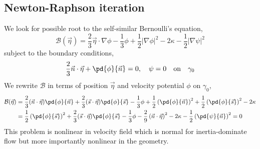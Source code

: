 \documentclass{jfm}
\begin{document}
\subsection{Newton-Raphson iteration}
We look for possible root to the self-similar Bernoulli's equation,
\begin{equation}
\mathcal{B}(\vec{\eta})=\frac{2}{3}\vec{\eta}\cdot \nabla \phi  -\frac{1}{3}\phi
+\frac{1}{2}|\nabla \phi|^2-2\kappa-\frac{1}{2}|\nabla \psi|^2
\end{equation}
subject to the boundary conditions,
\begin{equation}
\frac{2}{3}\vec{n}\cdot \vec{\eta}+\pd{\phi}{\vec{n}}=0,\quad
\psi =0 \quad\textrm{on}\quad\gamma_0
\end{equation}
We rewrite $\mathcal{B}$ in terms of position $\vec{\eta}$ and velocity potential $\phi$ on $\gamma_0$,
\begin{align}
\nonumber \mathcal{B}(\vec{\eta})&=\frac{2}{3}(\vec{n}\cdot\vec{\eta}) \pd{\phi}{\vec{n}}+
\frac{2}{3}(\vec{s}\cdot\vec{\eta}) \pd{\phi}{\vec{s}}
  -\frac{1}{3}\phi+\frac{1}{2}\left( \pd{\phi}{\vec{n}}\right)^2
  +\frac{1}{2}\left( \pd{\phi}{\vec{s}}\right)^2-2\kappa\\
  &=\frac{1}{2}\left( \pd{\phi}{\vec{s}}\right)^2+
  \frac{2}{3}(\vec{s}\cdot\vec{\eta}) \pd{\phi}{\vec{s}}
  -\frac{1}{3}\phi-\frac{2}{9}\left( \vec{n}\cdot \vec{\eta}\right)^2
  -2\kappa-\frac{1}{2}\left( \pd{\psi}{\vec{n}}\right)^2=0
\end{align}
This problem is nonlinear in velocity field which is normal for inertia-dominate flow
but more importantly nonlinear in the geometry.
\end{document}
